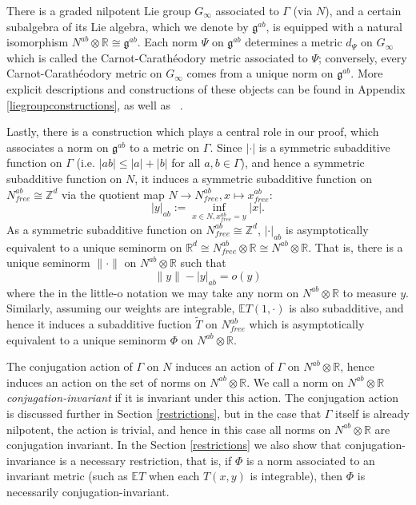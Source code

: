 \documentclass[12pt,reqno]{article}
\numberwithin{equation}{section}
\newcommand{\R}{\mathbb{R}}
\newcommand{\E}{\mathbb{E}}
\newcommand{\Z}{\mathbb{Z}}
\newcommand{\g}{\mathfrak{g}}
\begin{document}
There is a graded nilpotent Lie group $G_{\infty}$ associated to $\Gamma$ (via $N$), and a certain subalgebra of its Lie algebra, which we denote
 by $\g^{ab}$, is equipped with a natural isomorphism $N^{ab} \otimes \R \cong \g^{ab}$. Each norm $\Psi$ on $\g^{ab}$ determines
 a metric $d_{\Psi}$ on $G_{\infty}$ which is called the Carnot-Carath\'eodory metric associated to $\Psi$; conversely, every Carnot-Carath\'eodory
 metric on $G_{\infty}$ comes from a unique norm on $\g^{ab}$. More explicit descriptions and constructions of these objects can be found in 
 Appendix \ref{liegroupconstructions}, as well as ~\cite{CantrellFurman}.
 

Lastly, there is a construction which plays a central role in our proof,
which associates a norm on $\g^{ab}$ to a metric on $\Gamma$.
Since $| \cdot |$ is a symmetric subadditive function on $\Gamma$ (i.e. $|ab| \le |a| + |b|$ for all $a,b \in \Gamma$), and
hence a symmetric subadditive function on $N$,
it induces a symmetric subadditive function on $N^{ab}_{free} \cong \Z^d$ via the quotient map $N \to N^{ab}_{free},
x \mapsto x^{ab}_{free}$:
\[ |y|_{ab} := \inf_{x \in N, x^{ab}_{free} = y} |x|. \]
As a symmetric subadditive function on $N^{ab}_{free} \cong \Z^d$, $|\cdot|_{ab}$ is asymptotically equivalent to a unique seminorm on 
$\R^d \cong N^{ab}_{free} \otimes \R \cong N^{ab} \otimes \R$.
That is, there is a unique seminorm $\|\cdot\|$ on $N^{ab} \otimes \R$ such that 
\[ \|y\| - |y|_{ab} = o(y) \]
where the in the little-o notation we may take any norm on $N^{ab} \otimes \R$ to measure $y$.
Similarly, assuming our weights are integrable, $\E T(1,\cdot)$ is also subadditive, 
and hence it induces a subadditive fuction $\tilde{T}$ on $N^{ab}_{free}$ which is 
asymptotically equivalent to a unique seminorm
$\Phi$ on $N^{ab} \otimes \R$.

The conjugation action of $\Gamma$ on $N$ induces an action of $\Gamma$ on $N^{ab} \otimes \R$, hence induces an action
on the set of norms on $N^{ab} \otimes \R$. We call a norm on $N^{ab} \otimes \R$ \emph{conjugation-invariant} if it is invariant
under this action. The conjugation action is discussed further in Section \ref{restrictions}, but in the case that $\Gamma$
itself is already nilpotent, the action is trivial, and hence in this case all norms on $N^{ab} \otimes \R$ are conjugation invariant.
In the Section \ref{restrictions} we also show that conjugation-invariance is a necessary restriction, that is, if $\Phi$ is a norm associated
to an invariant metric (such as $\E T$ when each $T(x,y)$ is integrable), then $\Phi$ is necessarily conjugation-invariant.
 
\end{document}
